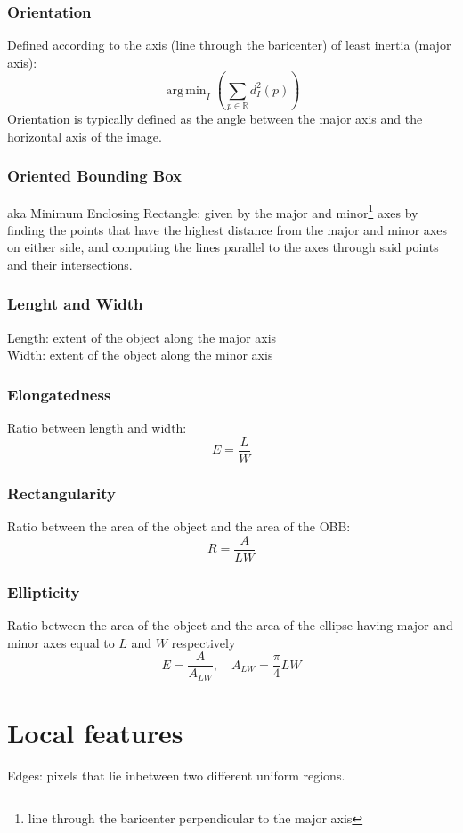\documentclass{article}
\DeclareMathOperator*{\argmin}{arg\,min}
\begin{document}
\subsubsection{Orientation}
Defined according to the axis (line through the baricenter) of least inertia (major axis):
\[
    \argmin_I\left( \displaystyle\sum_{p\in\mathbb{R}}^{}d_I^2(p)\right)
\]
Orientation is typically defined as the angle between the major axis and the horizontal axis of the image.
\subsubsection{Oriented Bounding Box}
aka Minimum Enclosing Rectangle: given by the major and minor\footnote{line through the baricenter perpendicular to the major axis} axes by finding the points that have the highest distance from the major and minor axes on either side, and computing the lines parallel to the axes through said points and their intersections. 
\subsubsection{Lenght and Width}
Length: extent of the object along the major axis\\
Width: extent of the object along the minor axis\\
\subsubsection{Elongatedness}
Ratio between length and width:
\[
    E=\displaystyle\frac{L}{W}
\]
\subsubsection{Rectangularity}
Ratio between the area of the object and the area of the OBB:
\[
    R=\displaystyle\frac{A}{LW}
\]
\subsubsection{Ellipticity}
Ratio between the area of the object and the area of the ellipse having major and minor axes equal to $L$ and $W$ respectively
\[
    E=\displaystyle\frac{A}{A_{LW}},\quad A_{LW}=\displaystyle\frac{\pi}{4}LW
\]

\section{Local features}
Edges: pixels that lie inbetween two different uniform regions. 
\end{document}
